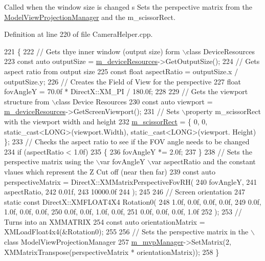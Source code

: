 Called when the window size is changed s Sets the perspective matrix from the \mbox{\hyperlink{class_model_view_projection_manager}{Model\+View\+Projection\+Manager}} and the m\+\_\+scissor\+Rect. 



Definition at line 220 of file Camera\+Helper.\+cpp.


\begin{DoxyCode}
221 \{
222     \textcolor{comment}{// Gets thye inner window (output size) form \(\backslash\)class DeviceResources}
223     \textcolor{keyword}{const} \textcolor{keyword}{auto} outputSize = \mbox{\hyperlink{class_camera_helper_a68562f65262d3c90532df0a194624ec9}{m\_deviceResources}}->GetOutputSize();
224     \textcolor{comment}{// Gets aspect ratio from output size}
225     \textcolor{keyword}{const} \textcolor{keywordtype}{float} aspectRatio = outputSize.x / outputSize.y;
226     \textcolor{comment}{// Creates the Field of View for the perspective}
227     \textcolor{keywordtype}{float} fovAngleY = 70.0f * DirectX::XM\_PI / 180.0f;
228 
229     \textcolor{comment}{// Gets the viewport structure from \(\backslash\)class Device Resources}
230     \textcolor{keyword}{const} \textcolor{keyword}{auto} viewport = \mbox{\hyperlink{class_camera_helper_a68562f65262d3c90532df0a194624ec9}{m\_deviceResources}}->GetScreenViewport();
231     \textcolor{comment}{// Sets \(\backslash\)property m\_scissorRect with the viewport width and height}
232     \mbox{\hyperlink{class_camera_helper_add052fea87500f1d3b2732ec46c3ae85}{m\_scissorRect}} = \{ 0, 0, \textcolor{keyword}{static\_cast<}LONG\textcolor{keyword}{>}(viewport.Width), static\_cast<LONG>(viewport.
      Height) \};
233     \textcolor{comment}{// Checks the aspect ratio to see if the FOV angle needs to be changed}
234     \textcolor{keywordflow}{if} (aspectRatio < 1.0f)
235     \{
236         fovAngleY *= 2.0f;
237     \}
238     \textcolor{comment}{// Sets the perspective matrix using the \(\backslash\)var fovAngleY \(\backslash\)var aspectRatio and the constant vlaues which
       represent the Z Cut off (near then far)}
239     \textcolor{keyword}{const} \textcolor{keyword}{auto} perspectiveMatrix = DirectX::XMMatrixPerspectiveFovRH(
240         fovAngleY,
241         aspectRatio,
242         0.01f,
243         10000.0f
244     );
245 
246     \textcolor{comment}{// Screen orientation}
247     \textcolor{keyword}{static} \textcolor{keyword}{const} DirectX::XMFLOAT4X4 Rotation0(
248         1.0f, 0.0f, 0.0f, 0.0f,
249         0.0f, 1.0f, 0.0f, 0.0f,
250         0.0f, 0.0f, 1.0f, 0.0f,
251         0.0f, 0.0f, 0.0f, 1.0f
252     );
253     \textcolor{comment}{// Turns into an XMMATRIX}
254     \textcolor{keyword}{const} \textcolor{keyword}{auto} orientationMatrix = XMLoadFloat4x4(&Rotation0);
255 
256     \textcolor{comment}{// Sets the perspective matrix in the \(\backslash\)class ModelViewProjectionManager}
257     \mbox{\hyperlink{class_camera_helper_a10d96783299a8c958f84d46542a3d93f}{m\_mvpManager}}->SetMatrix(2, XMMatrixTranspose(perspectiveMatrix * orientationMatrix));
258 \}
\end{DoxyCode}
